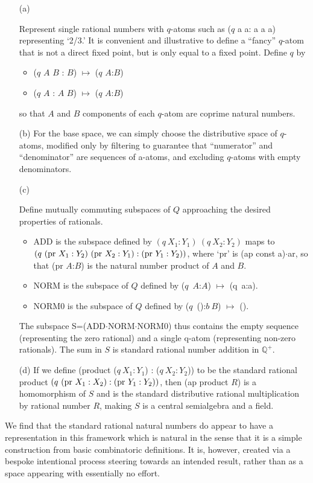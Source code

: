 \documentclass[11pt]{article}
\begin{document}
\begin{itemize} 
\item[(a)] { 
Represent single rational numbers with $q$-atoms such as ($q$ a a: a a a) representing `2/3.'  
It is convenient and illustrative to define a ``fancy'' $q$-atom that is not a direct fixed point, but is only equal to a fixed point. Define $q$ by 
\begin{itemize}
\item{($q$ $A$ $B$ : $B$) $\mapsto$ ($q$ $A$:$B$)}
\item{($q$ $A$ : $A$ $B$) $\mapsto$ ($q$ $A$:$B$)}
\end{itemize}
so that $A$ and $B$ components of each $q$-atom are coprime natural numbers. 
}
 \item[(b)] {For the base space, we can simply choose the distributive space of $q$-atoms, modified only by 
 filtering to guarantee that ``numerator'' and ``denominator'' are sequences of a-atoms, and excluding $q$-atoms with empty denominators. 
}
 \item[(c)] {Define mutually commuting subspaces of $Q$ approaching the desired properties of rationals. 
\begin{itemize}
\item{ADD is the subspace defined by $(q\ X_1:Y_1)\ (q\ X_2:Y_2)$ maps to 
$(q\ ({\rm pr}\ X_1:Y_2)\ ({\rm pr}\ X_2:Y_1) : ({\rm pr}\ Y_1:Y_2))$, where 
`pr' is (ap const a)$\cdot$ar, so that (pr $A$:$B$) is the natural number product of $A$ and $B$.}
\item{NORM is the subspace of $Q$ defined by ($q$\ $A$:$A$) $\mapsto$ (q\ a:a).}
\item{NORM0 is the subspace of $Q$ defined by ($q$\ ():$b\ B$) $\mapsto$ ().}  
\end{itemize}
The subspace S=(ADD$\cdot$NORM$\cdot$NORM0) thus contains the empty sequence (representing the zero rational) and a single q-atom (representing non-zero rationals).  The sum in $S$ is standard rational number addition in $\mathbb Q^+$.

 }
 \item[(d)] {If we define (product ($q\ X_1:Y_1$) : ($q\ X_2:Y_2$)) to be the standard rational product $(q\ ({\rm pr}\ X_1:X_2): ({\rm pr}\ Y_1:Y_2))$, then 
(ap product $R$) is a homomorphism of $S$ and is the standard distributive rational multiplication by rational number $R$, making  
$S$ is a central semialgebra and a field.}
 \end{itemize} 
 We find that the standard rational natural numbers do appear to have a representation in this framework which is natural in the sense that 
 it is a simple construction from basic combinatoric definitions.  It is, however, created via a bespoke intentional process steering towards 
 an intended result, rather than as a space appearing with essentially no effort. 
 
\end{document}
